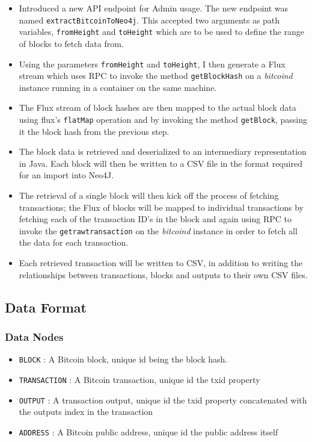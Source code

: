 \begin{itemize}
    \item Introduced a new API endpoint for Admin usage. The new endpoint was named \texttt{extractBitcoinToNeo4j}. This accepted two arguments as path variables, \texttt{fromHeight} and \texttt{toHeight} which are to be used to define the range of blocks to fetch data from. 
    \item Using the parameters \texttt{fromHeight} and \texttt{toHeight}, I then generate a Flux stream which uses RPC to invoke the method \texttt{getBlockHash} on a \textit{bitcoind} instance running in a container on the same machine. 
    \item The Flux stream of block hashes are then mapped to the actual block data using flux's \texttt{flatMap} operation and by invoking the method \texttt{getBlock}, passing it the block hash from the previous step. 
    \item The block data is retrieved and deserialized to an intermediary representation in Java. Each block will then be written to a CSV file in the format required for an import into Neo4J. 
    \item The retrieval of a single block will then kick off the process of fetching transactions; the Flux of blocks will be mapped to individual transactions by fetching each of the transaction ID's in the block and again using RPC to invoke the \texttt{getrawtransaction} on the \textit{bitcoind} instance in order to fetch all the data for each transaction. 
    \item Each retrieved transaction will be written to CSV, in addition to writing the relationships between transactions, blocks and outputs to their own CSV files. 
\end{itemize}

\subsection{Data Format}
\subsubsection{Data Nodes}
\begin{itemize}
    \item \texttt{BLOCK} : A Bitcoin block, unique id being the block hash. 
    \item \texttt{TRANSACTION} : A Bitcoin transaction, unique id the txid property
    \item \texttt{OUTPUT} : A transaction output, unique id the txid property concatenated with the outputs index in the transaction
    \item \texttt{ADDRESS} : A Bitcoin public address, unique id the public address itself
\end{itemize}

